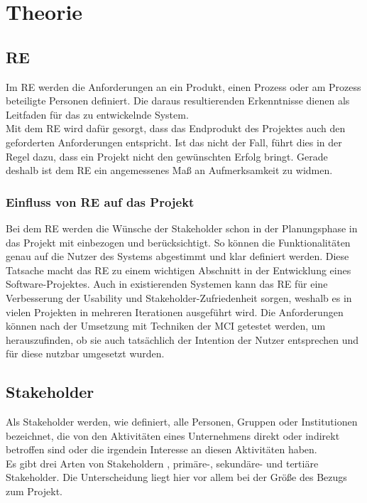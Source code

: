 \chapter{Theorie}

\section{\acl{RE}}
Im \ac{RE} werden die Anforderungen an ein Produkt, einen Prozess oder am Prozess beteiligte Personen definiert. Die daraus resultierenden Erkenntnisse dienen als Leitfaden für das zu entwickelnde System. \\
Mit dem \ac{RE} wird dafür gesorgt, dass das Endprodukt des Projektes auch den geforderten Anforderungen entspricht. Ist das nicht der Fall, führt dies in der Regel dazu, dass ein Projekt nicht den gewünschten Erfolg bringt. Gerade deshalb ist dem \ac{RE} ein angemessenes Maß an Aufmerksamkeit zu widmen.

\subsection{Einfluss von \acl{RE} auf das Projekt}
Bei dem \ac{RE} werden die Wünsche der Stakeholder schon in der Planungsphase in das Projekt mit einbezogen und berücksichtigt. So können die Funktionalitäten genau auf die Nutzer des Systems abgestimmt und klar definiert werden. Diese Tatsache macht das \ac{RE} zu einem wichtigen Abschnitt in der Entwicklung eines Software-Projektes. Auch in existierenden Systemen kann das \ac{RE} für eine Verbesserung der Usability und Stakeholder-Zufriedenheit sorgen, weshalb es in vielen Projekten in mehreren Iterationen ausgeführt wird. Die Anforderungen können nach der Umsetzung mit Techniken der \ac{MCI} getestet werden, um herauszufinden, ob sie auch tatsächlich der Intention der Nutzer entsprechen und für diese nutzbar umgesetzt wurden.

\section{Stakeholder}
Als Stakeholder werden, wie \cite{FLEIG1} definiert, alle Personen, Gruppen oder Institutionen bezeichnet, die von den Aktivitäten eines Unternehmens direkt oder indirekt betroffen sind oder die irgendein Interesse an diesen Aktivitäten haben.\\

Es gibt drei Arten von Stakeholdern \citep{Schaefer2}, primäre-, sekundäre- und tertiäre Stakeholder.
Die Unterscheidung liegt hier vor allem bei der Größe des Bezugs zum Projekt. 

